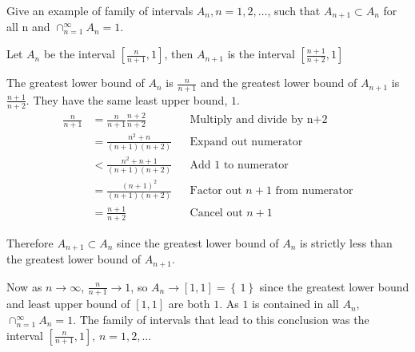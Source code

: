 \documentclass[a4paper]{article}
\begin{document}
Give an example of family of intervals $A_n, n = 1,2,\dots$, such that $A_{n+1} \subset A_{n}$ for
all n and $\cap_{n=1}^{\infty}A_n = 1$.

Let $A_n$ be the interval $[\frac{n}{n+1}, 1]$,
then $A_{n+1}$ is the interval $[\frac{n+1}{n+2}, 1]$

The greatest lower bound of $A_n$ is $\frac{n}{n+1}$ and the greatest lower bound of $A_{n+1}$ is
$\frac{n+1}{n+2}$. They have the same least upper bound, $1$.
\begin{align*}
  \frac{n}{n+1} &= \frac{n}{n+1}\frac{n+2}{n+2} && \text{Multiply and divide by n+2} \\
  &= \frac{n^2 + n}{(n+1)(n+2)} && \text{Expand out numerator} \\
  &< \frac{n^2 + n + 1}{(n+1)(n+2)} && \text{Add 1 to numerator} \\
  &= \frac{(n+1)^2}{(n+1)(n+2)} && \text{Factor out $n+1$ from numerator} \\
  &= \frac{n+1}{n+2} && \text{Cancel out $n+1$}
\end{align*}

Therefore $A_{n+1} \subset A_n$ since the greatest lower bound of $A_n$ is strictly less than the
greatest lower bound of $A_{n+1}$.

Now as $n \to \infty$, $\frac{n}{n+1} \to 1$, so $A_n \to [1, 1] = \left\{\,1\right\}$ since the
greatest lower bound and least upper bound of $[1, 1]$ are both $1$. As $1$ is contained in all
$A_n$, 
$\cap_{n=1}^{\infty}A_n = 1$. The family of intervals that lead to this conclusion was the
interval $[\frac{n}{n+1}, 1],\, n=1,2,\dots$
\end{document}
